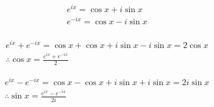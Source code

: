 \begin{align}
&e^{ix}=\cos x +i\sin x \\
&e^{-ix}=\cos x -i\sin x \\
\end{align}

\begin{align}
&e^{ix}+e^{-ix}=\cos x +\cos x +i\sin x  -i\sin x = 2\cos x \\
&\therefore\cos x=\frac{e^{ix}+e^{-ix}}{2}
\end{align}
    
\begin{align}
&e^{ix}-e^{-ix}=\cos x -\cos x +i\sin x +i\sin x = 2i\sin x \\
&\therefore\sin x=\frac{e^{ix}-e^{-ix}}{2i}
\end{align}

